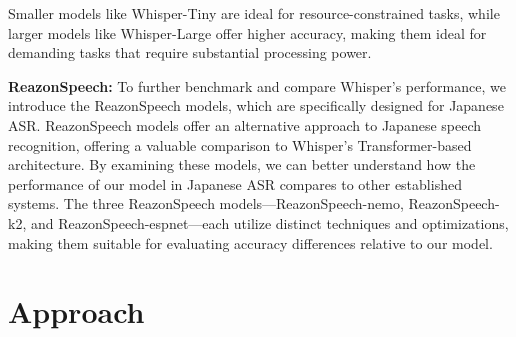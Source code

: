 \documentclass[10pt,twocolumn,letterpaper]{article}
\begin{document}
Smaller models like Whisper-Tiny are ideal for resource-constrained tasks, while larger models like Whisper-Large offer higher accuracy, making them ideal for demanding tasks that require substantial processing power. 

\textbf{ReazonSpeech:}
To further benchmark and compare Whisper’s performance, we introduce the ReazonSpeech models, which are specifically designed for Japanese ASR. ReazonSpeech models offer an alternative approach to Japanese speech recognition, offering a valuable comparison to Whisper’s Transformer-based architecture. By examining these models, we can better understand how the performance of our model in Japanese ASR compares to other established systems. The three ReazonSpeech models—ReazonSpeech-nemo\cite{ReazonSpeechNemo}, ReazonSpeech-k2\cite{ReazonSpeechK2}, and ReazonSpeech-espnet\cite{ReazonSpeechESPNet}—each utilize distinct techniques and optimizations, making them suitable for evaluating accuracy differences relative to our model.

\section{Approach}
\end{document}
